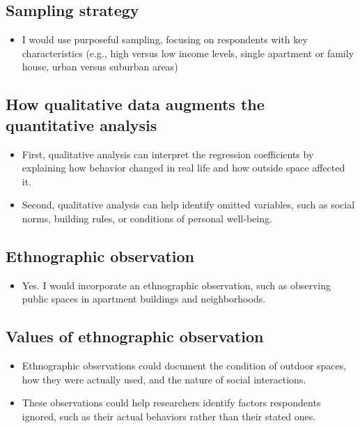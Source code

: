 \documentclass[
  letterpaper,
  DIV=11,
  numbers=noendperiod]{scrartcl}
\providecommand{\tightlist}{%
  \setlength{\itemsep}{0pt}\setlength{\parskip}{0pt}}
\begin{document}
\subsection{Sampling strategy}\label{sampling-strategy}

\begin{itemize}
\tightlist
\item
  I would use purposeful sampling, focusing on respondents with key
  characteristics (e.g., high versus low income levels, single apartment
  or family house, urban versus suburban areas)
\end{itemize}

\subsection{How qualitative data augments the quantitative
analysis}\label{how-qualitative-data-augments-the-quantitative-analysis}

\begin{itemize}
\item
  First, qualitative analysis can interpret the regression coefficients
  by explaining how behavior changed in real life and how outside space
  affected it.
\item
  Second, qualitative analysis can help identify omitted variables, such
  as social norms, building rules, or conditions of personal well-being.
\end{itemize}

\subsection{Ethnographic observation}\label{ethnographic-observation}

\begin{itemize}
\tightlist
\item
  Yes. I would incorporate an ethnographic observation, such as
  observing public spaces in apartment buildings and neighborhoods.
\end{itemize}

\subsection{Values of ethnographic
observation}\label{values-of-ethnographic-observation}

\begin{itemize}
\item
  Ethnographic observations could document the condition of outdoor
  spaces, how they were actually used, and the nature of social
  interactions.
\item
  These observations could help researchers identify factors respondents
  ignored, such as their actual behaviors rather than their stated ones.
\end{itemize}
\end{document}
